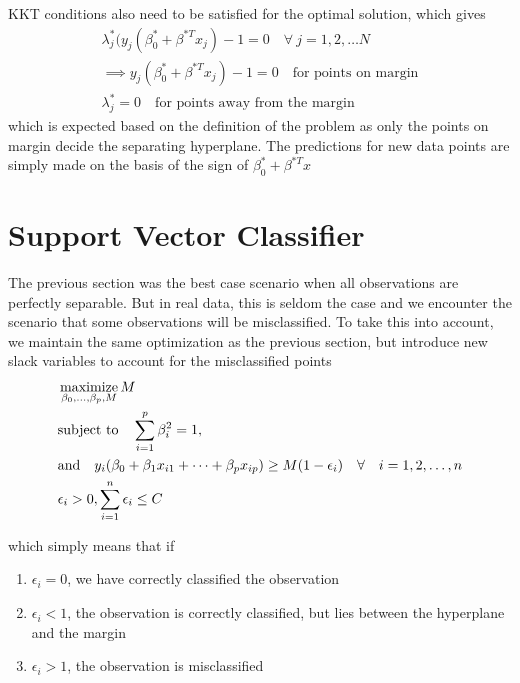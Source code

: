 \documentclass[../statistical_learning_notes.tex]{subfiles}
\begin{document}
    KKT conditions also need to be satisfied for the optimal solution, which gives
    \begin{gather*}
        \lambda_{j}^{*} (y_{j}(\beta_{0}^{*} + \beta^{*T}x_{j}) - 1 = 0 \quad \forall \: j = 1, 2, \ldots N\\
        \implies y_{j}(\beta_{0}^{*} + \beta^{*T}x_{j}) - 1 = 0 \quad \text{for points on margin}\\
        \lambda_{j}^{*} = 0 \quad \text{for points away from the margin}
    \end{gather*}
    which is expected based on the definition of the problem as only the points on margin decide the separating hyperplane. The predictions for new data points are simply made on the basis of the sign of $\beta_{0}^{*} + \beta^{*T}x$


    \section{Support Vector Classifier}
    The previous section was the best case scenario when all observations are perfectly separable. But in real data, this is seldom the case and we encounter the scenario that some observations will be misclassified. To take this into account, we maintain the same optimization as the previous section, but introduce new slack variables to account for the misclassified points
    \begin{align*}
        &\operatorname*{maximize}_{\beta_{0},\ldots,\beta_{p}, M} M\\
        &\text{subject to} \quad \sum_{i=1}^{p} \beta_{i}^{2} = 1,\\
        &\text{and} \quad y_{i}(\beta_{0} + \beta_{1}x_{i1} + \cdots + \beta_{p}x_{ip}) \geq M(1-\epsilon_{i}) \quad \forall \quad i = 1, 2, \ldots, n\\
        &\epsilon_{i} > 0, \sum_{i=1}^{n}\epsilon_{i} \leq C
    \end{align*}

    which simply means that if
    \begin{enumerate}
        \item $\epsilon_{i} = 0$, we have correctly classified the observation
        \item $\epsilon_{i} < 1$, the observation is correctly classified, but lies between the hyperplane and the margin
        \item $\epsilon_{i} > 1$, the observation is misclassified
    \end{enumerate}
    
\end{document}
